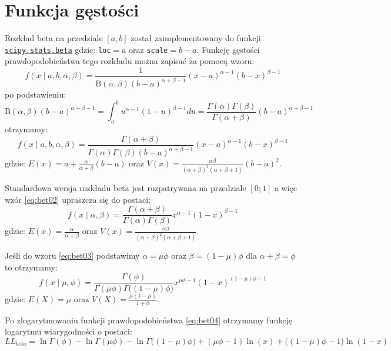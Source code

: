 \documentclass[polish,]{book}
\begin{document}
\hypertarget{R41}{%
\section{Funkcja gęstości}\label{R41}}

Rozkład beta na przedziale \([a,b]\) został zaimplementowany do funkcji \href{https://docs.scipy.org/doc/scipy-1.2.1/reference/generated/scipy.stats.beta.html\#scipy.stats.beta}{\texttt{scipy.stats.beta}} gdzie: \texttt{loc}\(=a\) oraz \texttt{scale}\(=b-a\). Funkcję gęstości prawdopodobieństwa tego rozkładu można zapisać za pomocą wzoru:
\begin{equation}
f(x\;|\;a,b,\alpha,\beta)=\frac{1}{\mathrm{B}(\alpha,\beta)(b-a)^{\alpha+\beta-1}}(x-a)^{\alpha-1}(b-x)^{\beta-1}
\label{eq:bet01}
\end{equation}
po podstawieniu:
\[\mathrm{B}(\alpha,\beta)(b-a)^{\alpha+\beta-1}=\int_{a}^{b}u^{\alpha-1}(1-u)^{\beta-1}du=\frac{\Gamma(\alpha)\Gamma(\beta)}{\Gamma(\alpha+\beta)}(b-a)^{\alpha+\beta-1}\]
otrzymamy:
\begin{equation}
f(x\;|\;a,b,\alpha,\beta)=\frac{\Gamma(\alpha+\beta)}{\Gamma(\alpha)\Gamma(\beta)(b-a)^{\alpha+\beta-1}}(x-a)^{\alpha-1}(b-x)^{\beta-1}
\label{eq:bet02}
\end{equation}
gdzie: \(E(x)=a+\frac{\alpha}{\alpha+\beta}(b-a)\) oraz \(V(x)=\frac{\alpha\beta}{(\alpha+\beta)^2(\alpha+\beta+1)}(b-a)^2\).

Standardowa wersja rozkładu beta jest rozpatrywana na przedziale \([0;1]\) a więc wzór \eqref{eq:bet02} upraszcza się do postaci:
\begin{equation}
f(x\;|\;\alpha,\beta)=\frac{\Gamma(\alpha+\beta)}{\Gamma(\alpha)\Gamma(\beta)}x^{\alpha-1}(1-x)^{\beta-1}
\label{eq:bet03}
\end{equation}
gdzie: \(E(x)=\frac{\alpha}{\alpha+\beta}\) oraz \(V(x)=\frac{\alpha\beta}{(\alpha+\beta)^2(\alpha+\beta+1)}\).

Jeśli do wzoru \eqref{eq:bet03} podstawimy \(\alpha=\mu\phi\) oraz \(\beta=(1-\mu)\phi\) dla \(\alpha+\beta=\phi\) to otrzymamy:
\begin{equation}
f(x\;|\;\mu,\phi)=\frac{\Gamma(\phi)}{\Gamma(\mu\phi)\Gamma\big((1-\mu)\phi\big)}x^{\mu\phi-1}(1-x)^{(1-\mu)\phi-1}
\label{eq:bet04}
\end{equation}
gdzie: \(E(X)=\mu\) oraz \(V(X)=\frac{\mu(1-\mu)}{1+\phi}\).

Po zlogarytmowaniu funkcji prawdopodobieństwa \eqref{eq:bet04}
otrzymamy funkcję logarytmu wiarygodności o postaci:
\begin{equation}
LL_{beta}=\ln\Gamma(\phi)-\ln\Gamma(\mu\phi)-\ln\Gamma\big((1-\mu)\phi\big)+(\mu\phi-1)\ln(x)+\big((1-\mu)\phi-1\big)\ln(1-x)
\label{eq:betLL01}
\end{equation}
\end{document}
